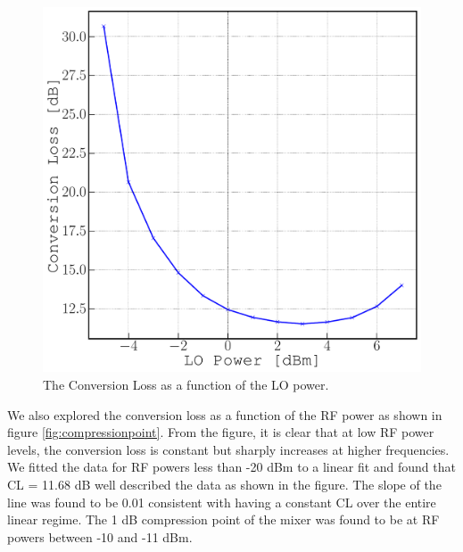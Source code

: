 \documentclass[twocolumn, aps, floatfix]{revtex4-1}
\begin{document}
\begin{figure}[!htbp]
    \includegraphics[scale=0.35]{IF_Power_vs_LO_power.pdf}
    \caption{The Conversion Loss as a function of the LO power.}
    \label{fig:CLvsLOpower}
\end{figure}

We also explored the conversion loss as a function of the RF power as shown in figure \ref{fig:compressionpoint}. From the figure, it is clear that at low RF power levels, the conversion loss is constant but sharply increases at higher frequencies. We fitted the data for RF powers less than -20 dBm to a linear fit and found that CL = 11.68 dB well described the data as shown in the figure. The slope of the line was found to be 0.01 consistent with having a constant CL over the entire linear regime. The 1 dB compression point of the mixer was found to be at RF powers between -10 and -11 dBm. 
\end{document}
